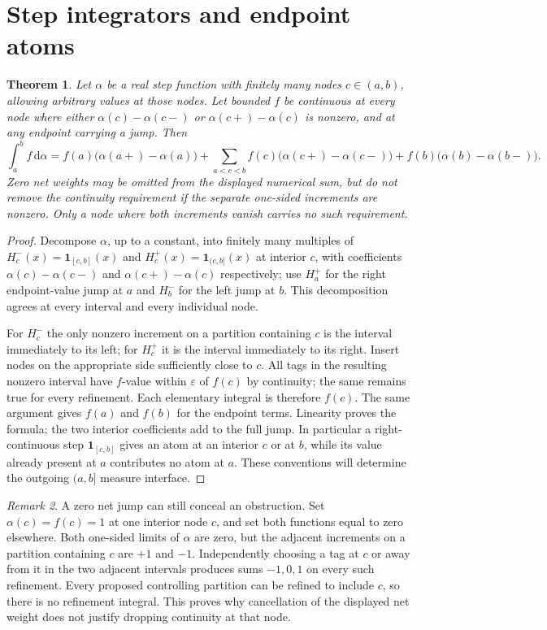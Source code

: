\documentclass[11pt,oneside,a4paper]{book}
\newtheorem{theorem}{Theorem}[chapter]
\theoremstyle{definition}
\theoremstyle{remark}
\newtheorem{remark}[theorem]{Remark}
\newcommand{\eps}{\varepsilon}
\newcommand{\dd}{\,\mathrm d}
\newcommand{\KEntry}[2]{\Needspace{7\baselineskip}\section{#2}\label{#1}{\small\sffamily\color{black!60}\detokenize{#1}}\par}
\begin{document}
\KEntry{K03.15.rs_jump}{Step integrators and endpoint atoms}
\begin{theorem}
Let $\alpha$ be a real step function with finitely many nodes $c\in(a,b)$, allowing arbitrary values at those nodes. Let bounded $f$ be continuous at every node where either $\alpha(c)-\alpha(c-)$ or $\alpha(c+)-\alpha(c)$ is nonzero, and at any endpoint carrying a jump. Then
\[\int_a^b f\dd\alpha=f(a)\bigl(\alpha(a+)-\alpha(a)\bigr)
+\sum_{a<c<b}f(c)\bigl(\alpha(c+)-\alpha(c-)\bigr)
+f(b)\bigl(\alpha(b)-\alpha(b-)\bigr).\]
Zero net weights may be omitted from the displayed numerical sum, but do not remove the continuity requirement if the separate one-sided increments are nonzero. Only a node where both increments vanish carries no such requirement.
\end{theorem}
\begin{proof}
Decompose $\alpha$, up to a constant, into finitely many multiples of $H_c^-(x)=\mathbf1_{[c,b]}(x)$ and $H_c^+(x)=\mathbf1_{(c,b]}(x)$ at interior $c$, with coefficients $\alpha(c)-\alpha(c-)$ and $\alpha(c+)-\alpha(c)$ respectively; use $H_a^+$ for the right endpoint-value jump at $a$ and $H_b^-$ for the left jump at $b$. This decomposition agrees at every interval and every individual node.

For $H_c^-$ the only nonzero increment on a partition containing $c$ is the interval immediately to its left; for $H_c^+$ it is the interval immediately to its right. Insert nodes on the appropriate side sufficiently close to $c$. All tags in the resulting nonzero interval have $f$-value within $\eps$ of $f(c)$ by continuity; the same remains true for every refinement. Each elementary integral is therefore $f(c)$. The same argument gives $f(a)$ and $f(b)$ for the endpoint terms. Linearity proves the formula; the two interior coefficients add to the full jump. In particular a right-continuous step $\mathbf1_{[c,b]}$ gives an atom at an interior $c$ or at $b$, while its value already present at $a$ contributes no atom at $a$. These conventions will determine the outgoing $(a,b]$ measure interface.
\end{proof}

\begin{remark}
A zero net jump can still conceal an obstruction. Set $\alpha(c)=f(c)=1$ at one interior node $c$, and set both functions equal to zero elsewhere. Both one-sided limits of $\alpha$ are zero, but the adjacent increments on a partition containing $c$ are $+1$ and $-1$. Independently choosing a tag at $c$ or away from it in the two adjacent intervals produces sums $-1,0,1$ on every such refinement. Every proposed controlling partition can be refined to include $c$, so there is no refinement integral. This proves why cancellation of the displayed net weight does not justify dropping continuity at that node.
\end{remark}
\end{document}
